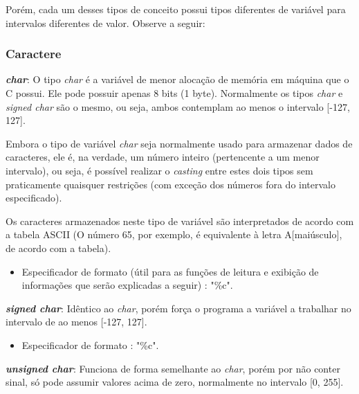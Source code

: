 \documentclass[12pt]{article}
\newcommand\tab[1][1cm]{\hspace*{#1}}
\begin{document}
\par\tab Porém, cada um desses tipos de conceito possui tipos diferentes de variável para intervalos diferentes de valor. Observe a seguir:

\subsubsection{Caractere}
\par\textbf{\textit{char}}: O tipo \textit{char} é a variável de menor alocação de memória em máquina que o C possui. Ele pode possuir apenas 8 bits (1 byte). Normalmente os tipos \textit{char} e \textit{signed char} são o mesmo, ou seja, ambos contemplam ao menos o intervalo [-127, 127].

\hspace{0.25cm}
\begin{tcolorbox}[colback=yellow!5!white,colframe=yellow!75!black,title=Atenção!]
  \par\tab Embora o tipo de variável \textit{char} seja normalmente usado para armazenar dados de caracteres, ele é, na verdade, um número inteiro (pertencente a um menor intervalo), ou seja, é possível realizar o \textit{casting} entre estes dois tipos sem praticamente quaisquer restrições (com exceção dos números fora do intervalo especificado).
  \par\tab Os caracteres armazenados neste tipo de variável são interpretados de acordo com a tabela ASCII (O número 65, por exemplo, é equivalente à letra A[maiúsculo], de acordo com a tabela)\cite{wiki:ascii_table}.
\end{tcolorbox}

\begin{itemize}
    \item Especificador de formato (útil para as funções de leitura e exibição de informações que serão explicadas a seguir) : "\%c".
\end{itemize}

\hspace{0.2cm}
\par\textbf{\textit{signed char}}: Idêntico ao \textit{char}, porém força o programa a variável a trabalhar no intervalo de ao menos [-127, 127].

\begin{itemize}
    \item Especificador de formato : "\%c".
\end{itemize}

\hspace{0.2cm}
\par\textbf{\textit{unsigned char}}: Funciona de forma semelhante ao \textit{char}, porém por não conter sinal, só pode assumir valores acima de zero, normalmente no intervalo [0, 255].
\end{document}
